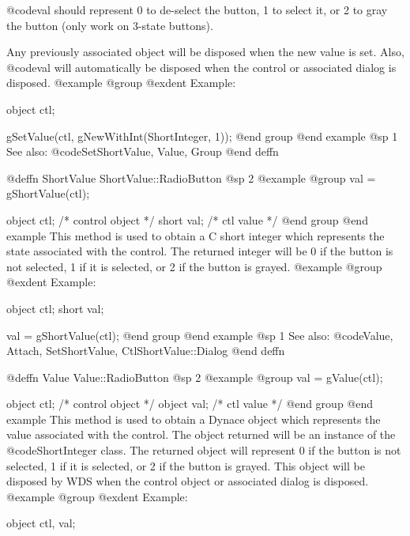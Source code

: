 {@code{val} should represent 0 to de-select the button, 1 to select it, or 2 to
gray the button (only work on 3-state buttons).

Any previously associated object will be disposed when the new value is set.
Also, @code{val} will automatically be disposed when the control or associated
dialog is disposed.
@example
@group
@exdent Example:

object  ctl;

gSetValue(ctl, gNewWithInt(ShortInteger, 1));
@end group
@end example
@sp 1
See also:  @code{SetShortValue, Value, Group}
@end deffn













@deffn {ShortValue} ShortValue::RadioButton
@sp 2
@example
@group
val = gShortValue(ctl);

object  ctl;   /*  control object  */
short   val;   /*  ctl value       */
@end group
@end example
This method is used to obtain a C short integer which represents the
state associated with the control.  The returned integer will be 0 if
the button is not selected, 1 if it is selected, or 2 if the button is grayed.
@example
@group
@exdent Example:

object  ctl;
short   val;

val = gShortValue(ctl);
@end group
@end example
@sp 1
See also:  @code{Value, Attach, SetShortValue, CtlShortValue::Dialog}
@end deffn













@deffn {Value} Value::RadioButton
@sp 2
@example
@group
val = gValue(ctl);

object  ctl;   /*  control object  */
object  val;   /*  ctl value       */
@end group
@end example
This method is used to obtain a Dynace object which represents the value
associated with the control.  The object returned will be an instance of
the @code{ShortInteger} class.  The returned object will represent 0 if
the button is not selected, 1 if it is selected, or 2 if the button is grayed.
This object will be disposed by WDS when the control object or
associated dialog is disposed.
@example
@group
@exdent Example:

object  ctl, val;

}
